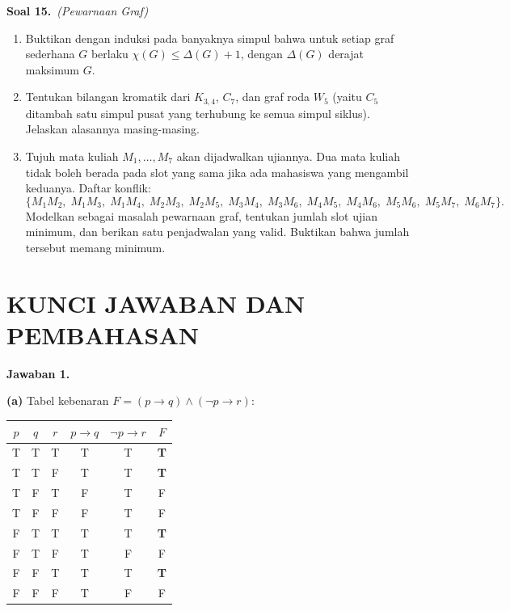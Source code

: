 \documentclass[11pt,a4paper]{article}
\newcommand{\soal}[2]{%
  \vspace{4pt}\noindent\textbf{Soal #1.}\ \textit{(#2)}\par\nobreak\vspace{2pt}}
\newcommand{\jawab}[1]{\vspace{4pt}\noindent\textbf{Jawaban #1.}\par\nobreak\vspace{2pt}}
\begin{document}
\soal{15}{Pewarnaan Graf}
\begin{enumerate}[label=(\alph*),leftmargin=*]
  \item Buktikan dengan induksi pada banyaknya simpul bahwa untuk setiap graf
  sederhana $G$ berlaku $\chi(G) \le \Delta(G) + 1$, dengan $\Delta(G)$ derajat
  maksimum $G$.
  \item Tentukan bilangan kromatik dari $K_{3,4}$, $C_{7}$, dan graf roda $W_{5}$
  (yaitu $C_5$ ditambah satu simpul pusat yang terhubung ke semua simpul siklus).
  Jelaskan alasannya masing-masing.
  \item Tujuh mata kuliah $M_1, \dots, M_7$ akan dijadwalkan ujiannya. Dua mata
  kuliah tidak boleh berada pada slot yang sama jika ada mahasiswa yang mengambil
  keduanya. Daftar konflik:
  \[
  \{M_1M_2,\; M_1M_3,\; M_1M_4,\; M_2M_3,\; M_2M_5,\; M_3M_4,\;
    M_3M_6,\; M_4M_5,\; M_4M_6,\; M_5M_6,\; M_5M_7,\; M_6M_7\}.
  \]
  Modelkan sebagai masalah pewarnaan graf, tentukan jumlah slot ujian minimum,
  dan berikan satu penjadwalan yang valid. Buktikan bahwa jumlah tersebut memang
  minimum.

\end{enumerate}

\clearpage
\section*{KUNCI JAWABAN DAN PEMBAHASAN}

\jawab{1}
\textbf{(a)} Tabel kebenaran $F = (p \rightarrow q) \wedge (\neg p \rightarrow r)$:

\begin{center}
\begin{tabular}{cccccc}
\toprule
$p$ & $q$ & $r$ & $p \rightarrow q$ & $\neg p \rightarrow r$ & $F$\\
\midrule
T & T & T & T & T & \textbf{T}\\
T & T & F & T & T & \textbf{T}\\
T & F & T & F & T & F\\
T & F & F & F & T & F\\
F & T & T & T & T & \textbf{T}\\
F & T & F & T & F & F\\
F & F & T & T & T & \textbf{T}\\
F & F & F & T & F & F\\
\bottomrule
\end{tabular}
\end{center}
\end{document}
